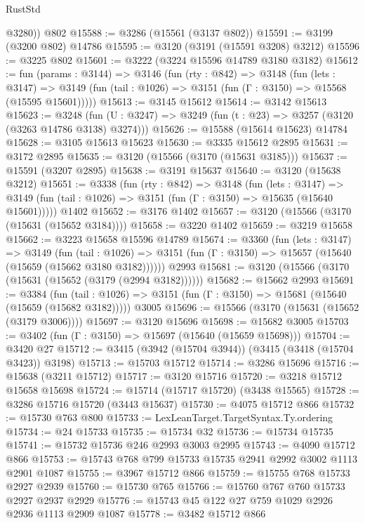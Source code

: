 \begin{lexlean}{RustStd}
\begin{coremodule}
        @3280))
    @802
@15588 := @3286 (@15561 (@3137 @802))
@15591 := @3199 (@3200 @802) @14786
@15595 := @3120 (@3191 (@15591 @3208) @3212)
@15596 := @3225 @802
@15601 := @3222 (@3224 @15596 @14789 @3180 @3182)
@15612 := fun (params : @3144) =>
  @3146
    (fun (rty : @842) =>
    @3148
      (fun (lets : @3147) =>
      @3149 (fun (tail : @1026) => @3151 (fun (Γ : @3150) => @15568 (@15595 @15601)))))
@15613 := @3145 @15612
@15614 := @3142 @15613
@15623 := @3248
    (fun (U : @3247) => @3249 (fun (t : @23) => @3257 (@3120 (@3263 @14786 @3138) @3274)))
@15626 := @15588 (@15614 @15623) @14784
@15628 := @3105 @15613 @15623
@15630 := @3335 @15612 @2895
@15631 := @3172 @2895
@15635 := @3120 (@15566 (@3170 (@15631 @3185)))
@15637 := @15591 (@3207 @2895)
@15638 := @3191 @15637
@15640 := @3120 (@15638 @3212)
@15651 := @3338
    (fun (rty : @842) =>
    @3148
      (fun (lets : @3147) =>
      @3149 (fun (tail : @1026) => @3151 (fun (Γ : @3150) => @15635 (@15640 @15601)))))
    @1402
@15652 := @3176 @1402
@15657 := @3120 (@15566 (@3170 (@15631 (@15652 @3184))))
@15658 := @3220 @1402
@15659 := @3219 @15658
@15662 := @3223 @15658 @15596 @14789
@15674 := @3360
    (fun (lets : @3147) =>
    @3149
      (fun (tail : @1026) =>
      @3151 (fun (Γ : @3150) => @15657 (@15640 (@15659 (@15662 @3180 @3182))))))
    @2993
@15681 := @3120 (@15566 (@3170 (@15631 (@15652 (@3179 (@2994 @3182))))))
@15682 := @15662 @2993
@15691 := @3384
    (fun (tail : @1026) => @3151 (fun (Γ : @3150) => @15681 (@15640 (@15659 (@15682 @3182)))))
    @3005
@15696 := @15566 (@3170 (@15631 (@15652 (@3179 @3006))))
@15697 := @3120 @15696
@15698 := @15682 @3005
@15703 := @3402 (fun (Γ : @3150) => @15697 (@15640 (@15659 @15698)))
@15704 := @3420 @27
@15712 := @3415 (@3942 (@15704 @3944)) (@3415 (@3418 (@15704 @3423)) @3198)
@15713 := @15703 @15712
@15714 := @3286 @15696
@15716 := @15638 (@3211 @15712)
@15717 := @3120 @15716
@15720 := @3218 @15712 @15658 @15698
@15724 := @15714 (@15717 @15720) (@3438 @15565)
@15728 := @3286 @15716 @15720 (@3443 @15637)
@15730 := @4075 @15712 @866
@15732 := @15730 @763 @800
@15733 := LexLeanTarget.TargetSyntax.Ty.ordering
@15734 := @24 @15733
@15735 := @15734 @32
@15736 := @15734 @15735
@15741 := @15732 @15736 @246 @2993 @3003 @2995
@15743 := @4090 @15712 @866
@15753 := @15743 @768 @799 @15733 @15735 @2941 @2992 @3002 @1113 @2901 @1087
@15755 := @3967 @15712 @866
@15759 := @15755 @768 @15733 @2927 @2939
@15760 := @15730 @765
@15766 := @15760 @767 @760 @15733 @2927 @2937 @2929
@15776 := @15743 @45 @122 @27 @759 @1029 @2926 @2936 @1113 @2909 @1087
@15778 := @3482 @15712 @866

\end{coremodule}
\end{lexlean}
